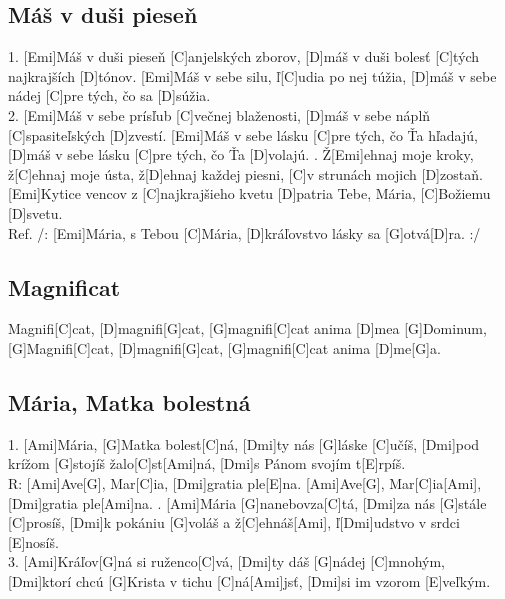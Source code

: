 \documentclass[10pt]{article}
\begin{document}
\begin{Large}
\begin{minipage}{\textwidth}
\subsection{Máš v duši pieseň}
\begin{multicols}{2}
\begin{guitar}	
	1. [Emi]Máš v duši pieseň [C]anjelských zborov,
	[D]máš v duši bolesť [C]tých najkrajších [D]tónov.
	[Emi]Máš v sebe silu, ľ[C]udia po nej túžia,
	[D]máš v sebe nádej [C]pre tých, čo sa [D]súžia.
	\\
	2. [Emi]Máš v sebe prísľub [C]večnej blaženosti,
	[D]máš v sebe náplň [C]spasiteľských [D]zvestí.
	[Emi]Máš v sebe lásku [C]pre tých, čo Ťa hľadajú,
	[D]máš v sebe lásku [C]pre tých, čo Ťa [D]volajú.
	. Ž[Emi]ehnaj moje kroky, ž[C]ehnaj moje ústa,
	ž[D]ehnaj každej piesni, 
	[C]v strunách mojich [D]zostaň.
	[Emi]Kytice vencov z [C]najkrajšieho kvetu
	[D]patria Tebe, Mária, [C]Božiemu [D]svetu.
	\\
	Ref. 
	/: [Emi]Mária, s Tebou [C]Mária,
	[D]kráľovstvo lásky sa [G]otvá[D]ra. :/
\end{guitar}
\end{multicols}
\end{minipage}

\begin{minipage}{\textwidth}
\subsection{Magnificat}
\begin{guitar}	
	[G]Magnifi[C]cat, [D]magnifi[G]cat,
	[G]magnifi[C]cat anima [D]mea [G]Dominum,
	[G]Magnifi[C]cat, [D]magnifi[G]cat,
	[G]magnifi[C]cat anima [D]me[G]a.
\end{guitar}
\end{minipage}

\begin{minipage}{\textwidth}
\subsection{Mária, Matka bolestná}
\begin{multicols}{2}
\begin{guitar}	
	1. [Ami]Mária, [G]Matka bolest[C]ná, 
	[Dmi]ty nás [G]láske [C]učíš,
	[Dmi]pod krížom [G]stojíš žalo[C]st[Ami]ná, 
	[Dmi]s Pánom svojím t[E]rpíš.
	\\
	R: [Ami]Ave[G], Mar[C]ia, 
	[Dmi]gratia ple[E]na. 
	[Ami]Ave[G], Mar[C]ia[Ami], 
	[Dmi]gratia ple[Ami]na.
	. [Ami]Mária [G]nanebovza[C]tá,
	[Dmi]za nás [G]stále [C]prosíš,
	[Dmi]k pokániu [G]voláš a ž[C]ehnáš[Ami], 
	ľ[Dmi]udstvo v srdci [E]nosíš.
	\\
	3. [Ami]Kráľov[G]ná si ruženco[C]vá, 
	[Dmi]ty dáš [G]nádej [C]mnohým,
	[Dmi]ktorí chcú [G]Krista v tichu [C]ná[Ami]jsť, 
	[Dmi]si im vzorom [E]veľkým.
\end{guitar}
\end{multicols}
\end{minipage}



\end{Large}
\end{document}
